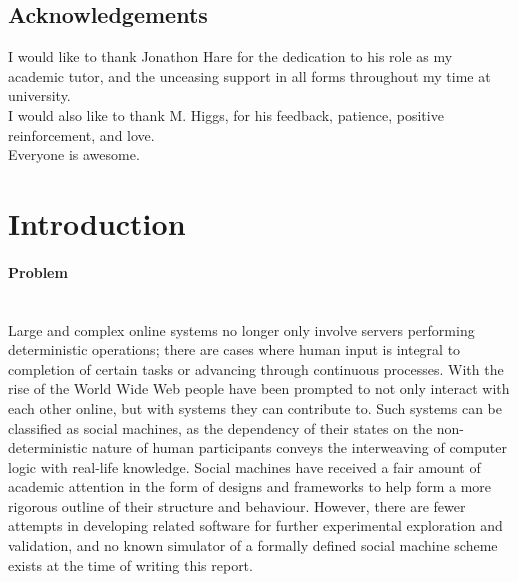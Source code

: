 \documentclass[12pt]{article}
\begin{document}
	\thispagestyle{empty}
	\clearpage\vspace*{\fill}
	\begin{center}
		\section*{Acknowledgements}
			I would like to thank Jonathon Hare for the dedication to his role as my academic tutor, and the unceasing support in all forms throughout my time at university.\\[1.5cm]
			I would also like to thank M. Higgs, for his feedback, patience, positive reinforcement, and love.\\[1.5cm]
			Everyone is awesome.
	\end{center}
		\vspace*{\fill}
	\thispagestyle{empty}\clearpage
	\section{Introduction}\label{sec1}
		\paragraph{Problem}\hfill\\
			Large and complex online systems no longer only involve servers performing deterministic operations; there are cases where human input is integral to completion of certain tasks or advancing through continuous processes. With the rise of the World Wide Web people have been prompted to not only interact with each other online, but with systems they can contribute to. Such systems can be classified as social machines, as the dependency of their states on the non-deterministic nature of human participants conveys the interweaving of computer logic with real-life knowledge.
			Social machines have received a fair amount of academic attention in the form of designs and frameworks to help form a more rigorous outline of their structure and behaviour. However, there are fewer attempts in developing related software for further experimental exploration and validation, and no known simulator of a formally defined social machine scheme exists at the time of writing this report.
	
\end{document}
